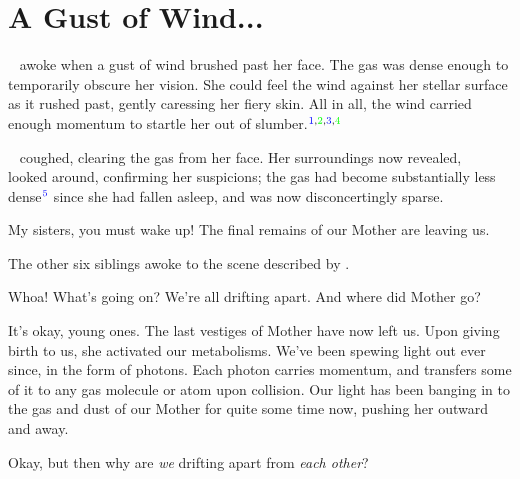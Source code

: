 \documentclass[main.tex]{subfiles}
\begin{document}

\chapter{A Gust of Wind...}

\par \nar \rmsterope~ awoke when a gust of wind brushed past her face.  The gas was dense enough to temporarily obscure her vision.  She could feel the wind against her stellar surface as it rushed past, gently caressing her fiery skin.  All in all, the wind carried enough momentum to startle her out of slumber.$^{\textcolor{blue}{1},\textcolor{green}{2},\textcolor{blue}{3},\textcolor{green}{4}}$

\par \nar \rmsterope~ coughed, clearing the gas from her face.  Her surroundings now revealed, \rmsterope~ looked around, confirming her suspicions; the gas had become substantially less dense$^{\textcolor{blue}{5}}$ since she had fallen asleep, and was now disconcertingly sparse. 

\par \Sterope My sisters, you must wake up!  The final remains of our Mother are leaving us.

\par \nar The other six siblings awoke to the scene described by \rmsterope.  

\par \Electra Whoa!  What's going on?  We're all drifting apart.  And where did Mother go?

\par \Maia It's okay, young ones.  The last vestiges of Mother have now left us.  Upon giving birth to us, she activated our metabolisms.  We've been spewing light out ever since, in the form of photons.  Each photon carries momentum, and transfers some of it to any gas molecule or atom upon collision.  Our light has been banging in to the gas and dust of our Mother for quite some time now, pushing her outward and away.


\par \Electra Okay, but then why are \textit{we} drifting apart from \textit{each other}?
\end{document}
